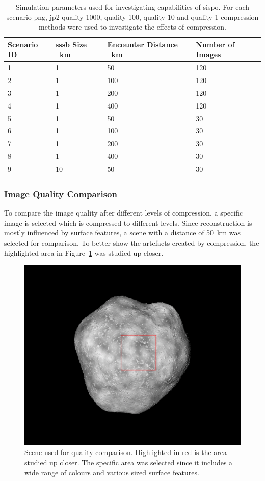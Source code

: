 \begin{table}[htb]
    \centering
    \caption{Simulation parameters used for investigating capabilities of \gls{sispo}. For each scenario \gls{png}, \gls{jp2} quality 1000, quality 100, quality 10 and quality 1 compression methods were used to investigate the effects of compression.}
    \label{tab:sim_params}
    \begin{tabular}{l|lll}
        Scenario ID  & \gls{sssb} Size \SI{}{\kilo\meter} & Encounter Distance \SI{}{\kilo\meter} & Number of Images \\ \hline
        1 & 1  & 50  & 120\\
        2 & 1  & 100 & 120\\
        3 & 1  & 200 & 120\\
        4 & 1  & 400 & 120\\
        5 & 1  & 50  & 30\\
        6 & 1  & 100 & 30\\
        7 & 1  & 200 & 30\\
        8 & 1  & 400 & 30\\
        9 & 10 & 50  & 30\\
    \end{tabular}
\end{table}

\subsubsection{Image Quality Comparison} \label{sec:img_quali_comp}
To compare the image quality after different levels of compression, a specific image is selected which is compressed to different levels. Since reconstruction is mostly influenced by surface features, a scene with a distance of \SI{50}{\kilo\meter} was selected for comparison. To better show the artefacts created by compression, the highlighted area in Figure~\ref{fig:img_quality_frame} was studied up closer.

\begin{figure}[htb]
    \centering
    \includegraphics[width=.7\textwidth]{doc/thesis/0_figures/compare_quality/set1/jp2_1000_frame.png}
    \caption{Scene used for quality comparison. Highlighted in red is the area studied up closer. The specific area was selected since it includes a wide range of colours and various sized surface features.}
    \label{fig:img_quality_frame}
\end{figure}

